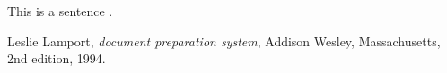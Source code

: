 \documentclass[12pt]{article}
\begin{document}
This is a sentence \cite{lamport94}.

\begin{thebibliography}{9}
  	Leslie Lamport,
  	\textit{document preparation system},
  	Addison Wesley, Massachusetts,
  	2nd edition,
 	1994.
\end{thebibliography}
\end{document}
